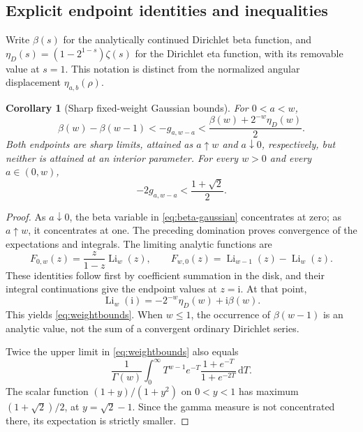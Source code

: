 \documentclass[11pt]{article}
\numberwithin{equation}{section}
\newtheorem{corollary}[theorem]{Corollary}
\theoremstyle{definition}
\theoremstyle{remark}
\DeclareMathOperator{\Li}{Li}
\newcommand{\dd}{\,\mathrm d}
\newcommand{\ii}{\mathrm i}
\begin{document}
\subsection{Explicit endpoint identities and inequalities}
Write $\beta(s)$ for the analytically continued Dirichlet beta function,
and $\eta_D(s)=(1-2^{1-s})\zeta(s)$ for the Dirichlet eta function,
with its removable value at $s=1$. This notation is distinct from the
normalized angular displacement $\eta_{a,b}(\rho)$.

\begin{corollary}[Sharp fixed-weight Gaussian bounds]\label{cor:weightbounds}
For $0<a<w$,
\begin{equation}\label{eq:weightbounds}
 \beta(w)-\beta(w-1)<-g_{a,w-a}
 <\frac{\beta(w)+2^{-w}\eta_D(w)}2.
\end{equation}
Both endpoints are sharp limits, attained as $a\uparrow w$ and
$a\downarrow0$, respectively, but neither is attained at an interior
parameter. For every $w>0$ and every $a\in(0,w)$,
\begin{equation}\label{eq:universalgaussian}
 -2g_{a,w-a}<\frac{1+\sqrt2}{2}.
\end{equation}
\end{corollary}
\begin{proof}
As $a\downarrow0$, the beta variable in \eqref{eq:beta-gaussian}
concentrates at zero; as $a\uparrow w$, it concentrates at one.
The preceding domination proves convergence of the expectations and
integrals. The limiting analytic functions are
\begin{equation}\label{eq:limitidentities}
 F_{0,w}(z)=\frac z{1-z}\Li_w(z),\qquad
 F_{w,0}(z)=\Li_{w-1}(z)-\Li_w(z).
\end{equation}
These identities follow first by coefficient summation in the disk,
and their integral continuations give the endpoint values at $z=\ii$.
At that point,
\[
 \Li_w(\ii)=-2^{-w}\eta_D(w)+\ii\beta(w).
\]
This yields \eqref{eq:weightbounds}. When $w\le1$, the occurrence of
$\beta(w-1)$ is an analytic value, not the sum of a convergent ordinary
Dirichlet series.

Twice the upper limit in \eqref{eq:weightbounds} also equals
\[
 \frac1{\Gamma(w)}\int_0^\infty T^{w-1}e^{-T}
                \frac{1+e^{-T}}{1+e^{-2T}}\dd T.
\]
The scalar function $(1+y)/(1+y^2)$ on $0<y<1$ has maximum
$(1+\sqrt2)/2$, at $y=\sqrt2-1$. Since the gamma measure is not
concentrated there, its expectation is strictly smaller.
\end{proof}
\end{document}
